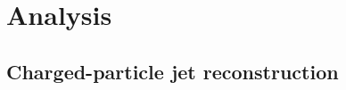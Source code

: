\documentclass[ALICE,manyauthors]{cernphprep}
\providecommand{\DIFaddbegin}{} %
\providecommand{\DIFaddend}{} %
\providecommand{\DIFdelbegin}{} %
\providecommand{\DIFdelend}{} %
\begin{document}
\DIFdelbegin %

\DIFdelend \section{Analysis}%
\label{sec:Analysis}

\DIFdelbegin %
\DIFdelend \DIFaddbegin \subsection{Charged-particle jet reconstruction}\DIFaddend %
\label{sec:JetRec}
\end{document}

